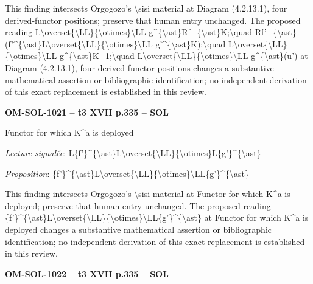 This finding intersects Orgogozo's \textbackslash{}sisi material at Diagram (4.2.13.1), four derived-functor positions; preserve that human entry unchanged. The proposed reading L\textbackslash{}overset\{\textbackslash{}LL\}\{\textbackslash{}otimes\}\textbackslash{}LL g\textasciicircum{}\{\textbackslash{}ast\}Rf\_\{\textbackslash{}ast\}K;\textbackslash{}quad Rf'\_\{\textbackslash{}ast\}(f'\textasciicircum{}\{\textbackslash{}ast\}L\textbackslash{}overset\{\textbackslash{}LL\}\{\textbackslash{}otimes\}\textbackslash{}LL g'\textasciicircum{}\{\textbackslash{}ast\}K);\textbackslash{}quad L\textbackslash{}overset\{\textbackslash{}LL\}\{\textbackslash{}otimes\}\textbackslash{}LL g\textasciicircum{}\{\textbackslash{}ast\}K\_1;\textbackslash{}quad L\textbackslash{}overset\{\textbackslash{}LL\}\{\textbackslash{}otimes\}\textbackslash{}LL g\textasciicircum{}\{\textbackslash{}ast\}(u') at Diagram (4.2.13.1), four derived-functor positions changes a substantive mathematical assertion or bibliographic identification; no independent derivation of this exact replacement is established in this review.\par
\par\noindent\textbf{OM-SOL-1021 -- t3 XVII p.335 -- SOL}\par
Functor for which K\textasciicircum{}a is deployed\par
\emph{Lecture signalée}: L\{f'\}\textasciicircum{}\{\textbackslash{}ast\}L\textbackslash{}overset\{\textbackslash{}LL\}\{\textbackslash{}otimes\}L\{g'\}\textasciicircum{}\{\textbackslash{}ast\}\par
\emph{Proposition}: \{f'\}\textasciicircum{}\{\textbackslash{}ast\}L\textbackslash{}overset\{\textbackslash{}LL\}\{\textbackslash{}otimes\}\textbackslash{}LL\{g'\}\textasciicircum{}\{\textbackslash{}ast\}\par
This finding intersects Orgogozo's \textbackslash{}sisi material at Functor for which K\textasciicircum{}a is deployed; preserve that human entry unchanged. The proposed reading \{f'\}\textasciicircum{}\{\textbackslash{}ast\}L\textbackslash{}overset\{\textbackslash{}LL\}\{\textbackslash{}otimes\}\textbackslash{}LL\{g'\}\textasciicircum{}\{\textbackslash{}ast\} at Functor for which K\textasciicircum{}a is deployed changes a substantive mathematical assertion or bibliographic identification; no independent derivation of this exact replacement is established in this review.\par
\par\noindent\textbf{OM-SOL-1022 -- t3 XVII p.335 -- SOL}\par
